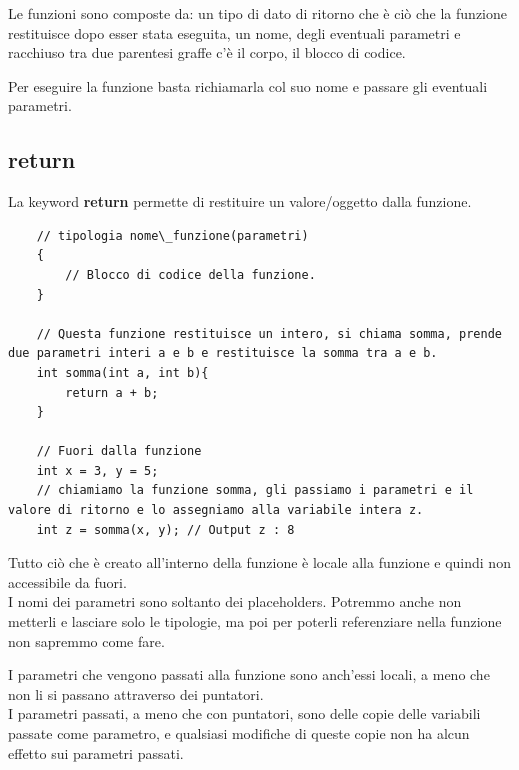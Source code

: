 \textsf{\small Le funzioni sono composte da: un tipo di dato di ritorno che è ciò che la funzione restituisce dopo esser stata eseguita, un nome, degli eventuali parametri e racchiuso tra due parentesi graffe c'è il corpo, il blocco di codice.}

\textsf{\small Per eseguire la funzione basta richiamarla col suo nome e passare gli eventuali parametri.} \\

\subsection{return}

\textsf{\small La keyword \textbf{return} permette di restituire un valore/oggetto dalla funzione.} \\

\begin{lstlisting}
	// tipologia nome\_funzione(parametri)
	{
		// Blocco di codice della funzione.
	}
	
	// Questa funzione restituisce un intero, si chiama somma, prende due parametri interi a e b e restituisce la somma tra a e b. 
	int somma(int a, int b){
		return a + b;
	}
	
	// Fuori dalla funzione
	int x = 3, y = 5;
	// chiamiamo la funzione somma, gli passiamo i parametri e il valore di ritorno e lo assegniamo alla variabile intera z.
	int z = somma(x, y); // Output z : 8
\end{lstlisting}

\textsf{\small Tutto ciò che è creato all'interno della funzione è locale alla funzione e quindi non accessibile da fuori.} \\

\textsf{\small I nomi dei parametri sono soltanto dei placeholders. Potremmo anche non metterli e lasciare solo le tipologie, ma poi per poterli referenziare nella funzione non sapremmo come fare.}

\textsf{\small I parametri che vengono passati alla funzione sono anch'essi locali, a meno che non li si passano attraverso dei puntatori.} \\

\textsf{\small I parametri passati, a meno che con puntatori, sono delle copie delle variabili passate come parametro, e qualsiasi modifiche di queste copie non ha alcun effetto sui parametri passati.} \\


